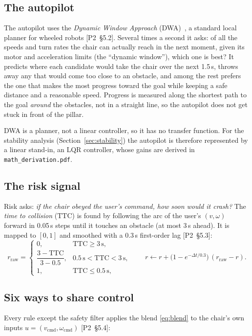 \documentclass[11pt,a4paper]{article}
\newcommand{\ptwo}[1]{{\small\textsf{[P2~\S#1]}}}
\newcommand{\code}[1]{\texttt{#1}}
\newcommand{\TTC}{\mathrm{TTC}}
\begin{document}
\subsection{The autopilot}
The autopilot uses the \emph{Dynamic Window Approach}
(DWA)~\cite{fox1997dwa}, a standard local planner for wheeled robots
\ptwo{5.2}. Several times a second it asks: of all the speeds and turn
rates the chair can actually reach in the next moment, given its motor
and acceleration limits (the ``dynamic window''), which one is best? It
predicts where each candidate would take the chair over the next 1.5\,s,
throws away any that would come too close to an obstacle, and among the
rest prefers the one that makes the most progress toward the goal while
keeping a safe distance and a reasonable speed. Progress is measured
along the shortest path to the goal \emph{around} the obstacles, not in a
straight line, so the autopilot does not get stuck in front of the
pillar.

DWA is a planner, not a linear controller, so it has no transfer
function. For the stability analysis (Section~\ref{sec:stability}) the
autopilot is therefore represented by a linear stand-in, an LQR
controller, whose gains are derived in \code{math\_derivation.pdf}.

\subsection{The risk signal}
Risk asks: \emph{if the chair obeyed the user's command, how soon would it
crash?} The \emph{time to collision} ($\TTC$) is found by following the
arc of the user's $(v, \omega)$ forward in 0.05\,s steps until it touches
an obstacle (at most 3\,s ahead). It is mapped to $[0, 1]$ and smoothed
with a 0.3\,s first-order lag \ptwo{5.3}:
\begin{equation}
r_{\mathrm{raw}} =
\begin{cases}
0, & \TTC \ge 3\,\text{s},\\[2pt]
\dfrac{3 - \TTC}{3 - 0.5}, & 0.5\,\text{s} < \TTC < 3\,\text{s},\\[8pt]
1, & \TTC \le 0.5\,\text{s},
\end{cases}
\qquad
r \leftarrow r + \bigl(1 - e^{-\Delta t/0.3}\bigr)\,(r_{\mathrm{raw}} - r).
\label{eq:risk}
\end{equation}

\subsection{Six ways to share control}
\label{sec:rules}
Every rule except the safety filter applies the blend \eqref{eq:blend} to
the chair's own inputs $u = (v_{\mathrm{cmd}}, \omega_{\mathrm{cmd}})$
\ptwo{5.4}:
\end{document}
